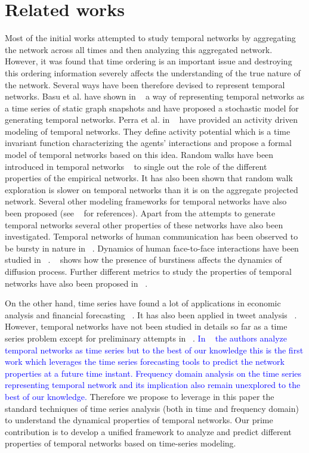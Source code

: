\noindent
\section{Related works}
\label{relatedworks}
Most of the initial works attempted to study temporal networks by aggregating the network across all times and then analyzing this aggregated network.
However, it was found that
time ordering is an important issue and destroying this ordering information severely affects the understanding of the true nature of the network. 
Several ways have been therefore devised to represent temporal networks. Basu et al. 
have shown in ~\cite{journals/corr/abs-1012-0260} a way of representing temporal networks as a time series of static graph snapshots and have proposed a stochastic model for generating 
temporal networks. Perra et al. in ~\cite{perra2012activity} have provided an activity driven modeling of temporal networks. They define activity potential which is a time 
invariant function characterizing the agents' interactions and propose a formal model of temporal networks based on this idea. Random walks have been introduced in 
temporal networks ~\cite{starnini2012random} to single out the role of the different properties of the empirical networks. It has also been shown that random walk 
exploration is slower on temporal networks than it is on the aggregate projected network. Several other modeling frameworks for temporal networks have also 
been proposed (see ~\cite{vespignani2011modelling,hill2010dynamic,hanneke2010discrete} for references). Apart from the attempts to generate temporal networks several other properties of these networks have also been investigated.
Temporal networks of human communication has been observed to be bursty in nature in ~\cite{barabasi2005origin}. Dynamics of human face-to-face interactions have been studied in ~\cite{zhao2011social}.
~\cite{tang2009temporal} shows how the presence of burstiness affects the dynamics of diffusion process. Further different metrics to study the properties of temporal networks 
have also been proposed in ~\cite{pan2011path}.  

On the other hand, time series have found a lot of applications in economic 
analysis and financial forecasting ~\cite{hamilton1989new}. It has also been applied in tweet analysis ~\cite{o2010tweets}. 
However, temporal networks have not 
been studied in details so far as a time series problem except for preliminary attempts in ~\cite{scherrer2008description,hempel2011inner}.
\textcolor{blue}{In ~\cite{scherrer2008description} the authors analyze temporal networks as time series but to the best of our knowledge this is the first 
work which leverages the time series forecasting tools to predict the network properties at a future time instant. 
Frequency domain analysis on the time series representing 
temporal network and its implication also remain unexplored to the best of our knowledge.}
 Therefore we propose to leverage in this paper the standard 
techniques of time series analysis (both in time and frequency domain) to understand the dynamical properties of temporal networks.
Our prime contribution is to develop a unified framework to analyze and predict different properties of temporal networks based on time-series modeling.

\medskip

